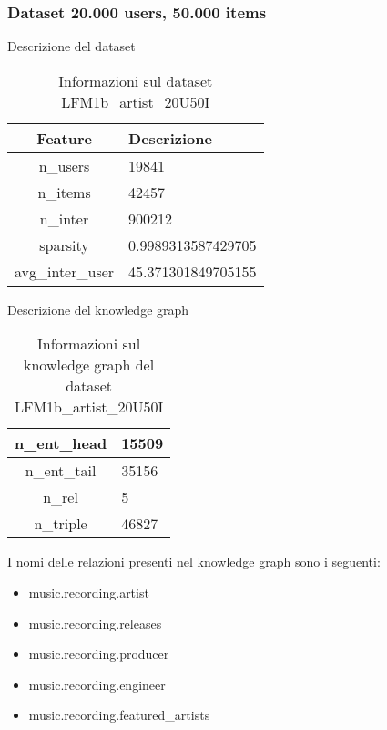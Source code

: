 \subsubsection{Dataset 20.000 users, 50.000 items}

Descrizione del dataset
\begin{table}[H]
    \centering
    \footnotesize
    \begin{tabularx}{\textwidth}{|c|X|}
        \hline
        \textbf{Feature} & \textbf{Descrizione} \\
        \hline
        n\_users & 19841 \\
        \hline
        n\_items & 42457 \\
        \hline
        n\_inter & 900212 \\
        \hline
        sparsity & 0.9989313587429705 \\
        \hline
        avg\_inter\_user & 45.371301849705155 \\
        \hline
    \end{tabularx}
    \caption{Informazioni sul dataset LFM1b\_artist\_20U50I}
    \label{tab:dataset_info}
\end{table}


\noindent Descrizione del knowledge graph
\begin{table}[H]
    \centering
    \footnotesize
    \begin{tabularx}{\textwidth}{|c|X|}
        \hline
        n\_ent\_head & 15509 \\
        \hline
        n\_ent\_tail & 35156 \\
        \hline
        n\_rel & 5 \\
        \hline
        n\_triple & 46827 \\
        \hline
    \end{tabularx}
    \caption{Informazioni sul knowledge graph del dataset LFM1b\_artist\_20U50I}
    \label{tab:dataset_info}
\end{table}

\noindent I nomi delle relazioni presenti nel knowledge graph sono i seguenti:
\begin{itemize}
    \item music.recording.artist
    \item music.recording.releases
    \item music.recording.producer
    \item music.recording.engineer
    \item music.recording.featured\_artists
\end{itemize}



